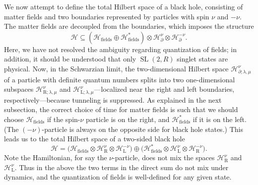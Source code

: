 \documentclass[12pt]{article}
\newcommand{\be}{\begin{equation}}
\newcommand{\ee}{\end{equation}}
\newcommand{\calH}{\mathcal{H}}
\newcommand{\RR}{\mathbb{R}}
\DeclareMathOperator{\tSL}{\widetilde{\mathrm{SL}}}
\newcommand{\la}{\text{L}}
\newcommand{\ra}{\text{R}}
\newcommand{\p}{\partial}
\def\widetilde#1{#1}%
\def\RR{R}
\begin{document}
We now attempt to define the total Hilbert space of a black hole, consisting of matter fields and two boundaries represented by particles with spin $\nu$ and $-\nu$. The matter fields are decoupled from the boundaries, which imposes the structure
\be \label{HS_gen}
\calH \subseteq (\calH_{\text{fields}} \oplus \calH_{\text{fields}}^*)\otimes\calH^{\nu}_{\p}\otimes\calH^{-\nu}_{\p}.
\ee
Here, we have not resolved the ambiguity regarding quantization of fields; in addition, it should be understood that only $\tSL(2,\RR)$ singlet states are physical. Now, in the Schwarzian limit, the two-dimensional Hilbert space $\calH^{\nu}_{\p;\lambda,\mu}$ of a particle with definite quantum numbers splits into two one-dimensional subspaces $\calH^{\nu}_{\ra;\lambda,\mu}$ and $\calH^{\nu}_{\la;\lambda,\mu}$---localized near the right and left boundaries, respectively---because tunneling is suppressed. As explained in the next subsection, the correct choice of time for matter fields is such that we should choose $\calH_{\text{fields}}$ if the spin-$\nu$ particle is on the right, and $\calH_{\text{fields}}^*$ if it is on the left. (The $(-\nu)$-particle is always on the opposite side for black hole states.) This leads us to the total Hilbert space of a two-sided black hole
\begin{equation}\label{HS_fRL}
\calH = \bigl(\calH_{\text{fields}}
\otimes\calH^{\nu}_{\ra}\otimes\calH^{-\nu}_{\la}\bigr)
\oplus\bigl(\calH_{\text{fields}}^*
\otimes\calH^{\nu}_{\la}\otimes\calH^{-\nu}_{\ra}\bigr).
\end{equation}
Note the Hamiltonian, for say the $\nu$-particle, does not mix the spaces $\calH^{\nu}_{\ra}$ and $\calH^{\nu}_{\la}$. Thus in the above the two terms in the direct sum do not mix under dynamics, and the quantization of fields is well-defined for any given state.
\end{document}
